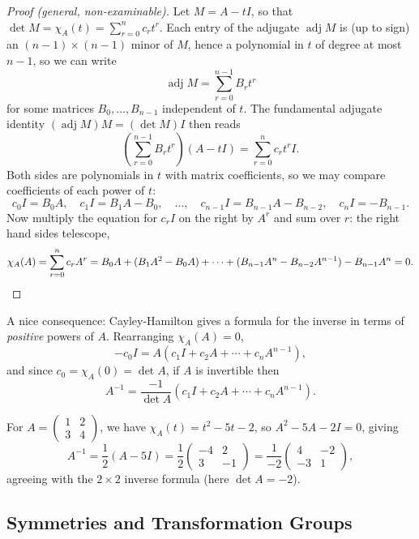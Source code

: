 \documentclass[a4paper]{scrartcl}
\newcommand{\adj}{\operatorname{adj}}
\begin{document}
\begin{proof}[Proof (general, non-examinable)]
	Let $M = A - tI$, so that $\det M = \chi_A(t) = \sum_{r = 0}^n c_r t^r$. Each entry of the adjugate $\adj M$ is (up to sign) an $(n-1) \times (n-1)$ minor of $M$, hence a polynomial in $t$ of degree at most $n - 1$, so we can write
	$$
	\adj M = \sum_{r = 0}^{n - 1}B_r t^r
	$$
	for some matrices $B_0, \dots, B_{n-1}$ independent of $t$. The fundamental adjugate identity $(\adj M) M = (\det M) I$ then reads
	$$
	\left(\sum_{r=0}^{n-1}B_rt^r\right)(A - tI) = \sum_{r = 0}^n c_r t^r I.
	$$
	Both sides are polynomials in $t$ with matrix coefficients, so we may compare coefficients of each power of $t$:
	$$
	c_0 I = B_0 A, \quad c_1I = B_1 A - B_0, \quad \dots, \quad c_{n-1}I = B_{n - 1}A - B_{n-2}, \quad c_n I = -B_{n-1}.
	$$
	Now multiply the equation for $c_r I$ on the right by $A^r$ and sum over $r$: the right hand sides telescope,
	$$
	\chi_A(A) = \sum_{r = 0}^n c_r A^r = B_0 A + (B_1A^2 - B_0 A) + \cdots + (B_{n-1}A^n - B_{n - 2}A^{n-1}) - B_{n-1}A^n = 0. \qedhere
	$$
\end{proof}

A nice consequence: Cayley-Hamilton gives a formula for the inverse in terms of \emph{positive} powers of $A$. Rearranging $\chi_A(A) = 0$,
$$
-c_0 I = A(c_1 I + c_2 A + \cdots + c_n A^{n-1}),
$$
and since $c_0 = \chi_A(0) = \det A$, if $A$ is invertible then
$$
A^{-1} = \frac{-1}{\det A}\left(c_1 I + c_2 A + \cdots + c_n A^{n-1}\right).
$$

\begin{example}
	For $A = \begin{pmatrix} 1 & 2 \\ 3 & 4\end{pmatrix}$, we have $\chi_A(t) = t^2 - 5t - 2$, so $A^2 - 5A - 2I = 0$, giving
	$$
	A^{-1} = \frac{1}{2}(A - 5I) = \frac{1}{2}\begin{pmatrix}
		-4 & 2 \\ 3 & -1
	\end{pmatrix} = \frac{1}{-2}\begin{pmatrix}
		4 & -2 \\ -3 & 1
	\end{pmatrix},
	$$
	agreeing with the $2 \times 2$ inverse formula (here $\det A = -2$).
\end{example}

\subsection{Symmetries and Transformation Groups}
\end{document}
